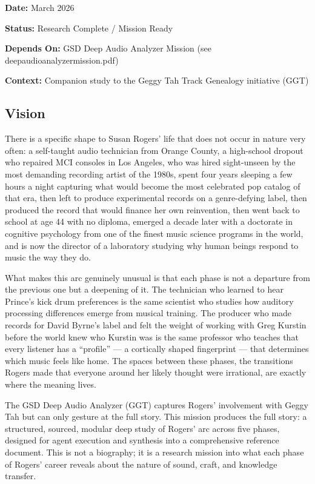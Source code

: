 \documentclass[11pt,letterpaper]{article}
\newcommand{\metafield}[2]{\textbf{\sffamily #1} #2\par}
\begin{document}
\metafield{Date:}{March 2026}
\metafield{Status:}{Research Complete / Mission Ready}
\metafield{Depends On:}{GSD Deep Audio Analyzer Mission (see deepaudioanalyzermission.pdf)}
\metafield{Context:}{Companion study to the Geggy Tah Track Genealogy initiative (GGT)}

\subsection{Vision}

There is a specific shape to Susan Rogers' life that does not occur in nature very often: a self-taught audio technician from Orange County, a high-school dropout who repaired MCI consoles in Los Angeles, who was hired sight-unseen by the most demanding recording artist of the 1980s, spent four years sleeping a few hours a night capturing what would become the most celebrated pop catalog of that era, then left to produce experimental records on a genre-defying label, then produced the record that would finance her own reinvention, then went back to school at age 44 with no diploma, emerged a decade later with a doctorate in cognitive psychology from one of the finest music science programs in the world, and is now the director of a laboratory studying why human beings respond to music the way they do.

What makes this arc genuinely unusual is that each phase is not a departure from the previous one but a deepening of it. The technician who learned to hear Prince's kick drum preferences is the same scientist who studies how auditory processing differences emerge from musical training. The producer who made records for David Byrne's label and felt the weight of working with Greg Kurstin before the world knew who Kurstin was is the same professor who teaches that every listener has a ``profile'' --- a cortically shaped fingerprint --- that determines which music feels like home. The spaces between these phases, the transitions Rogers made that everyone around her likely thought were irrational, are exactly where the meaning lives.

The GSD Deep Audio Analyzer (GGT) captures Rogers' involvement with Geggy Tah but can only gesture at the full story. This mission produces the full story: a structured, sourced, modular deep study of Rogers' arc across five phases, designed for agent execution and synthesis into a comprehensive reference document. This is not a biography; it is a research mission into what each phase of Rogers' career reveals about the nature of sound, craft, and knowledge transfer.
\end{document}
